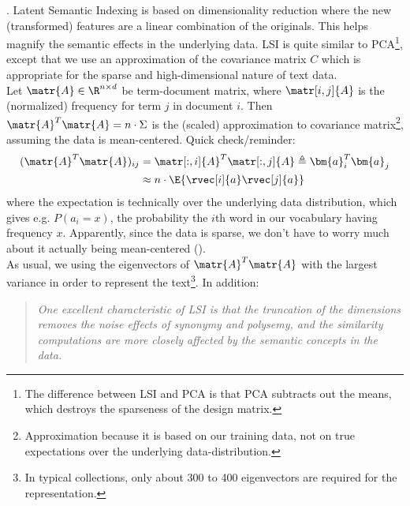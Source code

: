 \documentclass[11pt]{article}
\renewcommand\vec[2][]{\bm{#2}_{#1}}
\newcommand\myspace[1][]{\vspace{#1\bigskipamount}}
\newcommand\p{\Needspace{10\baselineskip} \noindent}
\begin{document}
\myspace 
\p {}. Latent Semantic Indexing is based on dimensionality reduction where the new (transformed) features are a linear combination of the originals. This helps magnify the semantic effects in the underlying data. LSI is quite similar to PCA\footnote{The difference between LSI and PCA is that PCA subtracts out the means, which destroys the sparseness of the design matrix.}, except that we use an approximation of the covariance matrix $C$ which is appropriate for the sparse and high-dimensional nature of text data.\\

\p Let $\matr{A} \in \R^{n \times d}$ be term-document matrix, where $\matr[i, j]{A}$ is the (normalized) frequency for term $j$ in document $i$. Then $\matr{A}^T \matr{A} = n \cdot \Sigma$ is the (scaled) approximation to covariance matrix\footnote{Approximation because it is based on our training data, not on true expectations over the underlying data-distribution.}, assuming the data is mean-centered. Quick check/reminder:
\begin{align}
	(\matr{A}^T \matr{A})_{ij} &= \matr[:, i]{A}^T \matr[:, j]{A} \triangleq \vec[i]{a}^T \vec[j]{a} \\
	&\approx n \cdot \E{\rvec[i]{a} \rvec[j]{a}}
\end{align}
where the expectation is technically over the underlying data distribution, which gives e.g. $P(a_i = x)$, the probability the $i$th word in our vocabulary having frequency $x$. Apparently, since the data is sparse, we don't have to worry much about it actually being mean-centered (). \\

\p As usual, we using the eigenvectors of $\matr{A}^T \matr{A}$ with the largest variance in order to represent the text\footnote{In typical collections, only about 300 to 400 eigenvectors are required for the representation.}. In addition:
\begin{quote}
	\textit{{\small One excellent characteristic of LSI is that the truncation of the dimensions
			removes the noise effects of synonymy and polysemy, and the similarity computations are more closely affected by the semantic concepts in the data. }}
\end{quote}
\end{document}
